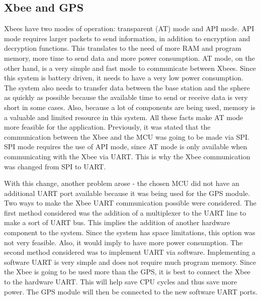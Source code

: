
\subsection{Xbee and GPS}

Xbees have two modes of operation: transparent (AT) mode and API mode. API mode requires larger packets to send information, in addition to encryption and decryption functions.  This translates to the need of more RAM and program memory, more time to send data and more power consumption.  AT mode, on the other hand, is a very simple and fast mode to communicate between Xbees. Since this system is battery driven, it needs to have a very low power consumption.  The system also needs to transfer data between the base station and the sphere as quickly as possible because the available time to send or receive data is very short in some cases.  Also, because a lot of components are being used, memory is a valuable and limited resource in this system. All these facts make AT mode more feasible for the application. Previously, it was stated that the communication between the Xbee and the MCU was going to be made via SPI. SPI mode requires the use of API mode, since AT mode is only available when communicating with the Xbee via UART. This is why the Xbee communication was changed from SPI to UART.

With this change, another problem arose - the chosen MCU did not have an additional UART port available because it was being used for the GPS module. Two ways to make the Xbee UART communication possible were considered.  The first method considered was the addition of a multiplexer to the UART line to make a sort of UART bus.  This implies the addition of another hardware component to the system.  Since the system has space limitations, this option was not very feasible.  Also, it would imply to have more power consumption.  The second method considered was to implement UART via software.  Implementing a software UART is very simple and does not require much program memory. Since the Xbee is going to be used more than the GPS, it is best to connect the Xbee to the hardware UART.  This will help save CPU cycles and thus save more power.  The GPS module will then be connected to the new software UART ports.